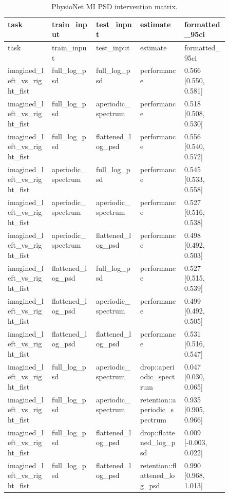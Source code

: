 \begin{longtable}{p{0.10\linewidth}p{0.10\linewidth}p{0.10\linewidth}p{0.10\linewidth}p{0.10\linewidth}}
\caption{PhysioNet MI PSD intervention matrix.}\label{tab:supp_physionet_mi_psd_matrix}\\
\toprule
task & train\_input & test\_input & estimate & formatted\_95ci\\
\midrule
\endfirsthead
\toprule
task & train\_input & test\_input & estimate & formatted\_95ci\\
\midrule
\endhead
imagined\_left\_vs\_right\_fist & full\_log\_psd & full\_log\_psd & performance & 0.566 [0.550, 0.581]\\
imagined\_left\_vs\_right\_fist & full\_log\_psd & aperiodic\_spectrum & performance & 0.518 [0.508, 0.530]\\
imagined\_left\_vs\_right\_fist & full\_log\_psd & flattened\_log\_psd & performance & 0.556 [0.540, 0.572]\\
imagined\_left\_vs\_right\_fist & aperiodic\_spectrum & full\_log\_psd & performance & 0.545 [0.533, 0.558]\\
imagined\_left\_vs\_right\_fist & aperiodic\_spectrum & aperiodic\_spectrum & performance & 0.527 [0.516, 0.538]\\
imagined\_left\_vs\_right\_fist & aperiodic\_spectrum & flattened\_log\_psd & performance & 0.498 [0.492, 0.503]\\
imagined\_left\_vs\_right\_fist & flattened\_log\_psd & full\_log\_psd & performance & 0.527 [0.515, 0.539]\\
imagined\_left\_vs\_right\_fist & flattened\_log\_psd & aperiodic\_spectrum & performance & 0.499 [0.492, 0.505]\\
imagined\_left\_vs\_right\_fist & flattened\_log\_psd & flattened\_log\_psd & performance & 0.531 [0.516, 0.547]\\
imagined\_left\_vs\_right\_fist & full\_log\_psd & aperiodic\_spectrum & drop::aperiodic\_spectrum & 0.047 [0.030, 0.065]\\
imagined\_left\_vs\_right\_fist & full\_log\_psd & aperiodic\_spectrum & retention::aperiodic\_spectrum & 0.935 [0.905, 0.966]\\
imagined\_left\_vs\_right\_fist & full\_log\_psd & flattened\_log\_psd & drop::flattened\_log\_psd & 0.009 [-0.003, 0.022]\\
imagined\_left\_vs\_right\_fist & full\_log\_psd & flattened\_log\_psd & retention::flattened\_log\_psd & 0.990 [0.968, 1.013]\\
\bottomrule
\end{longtable}
